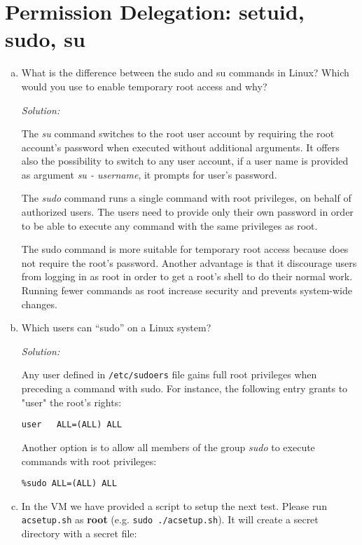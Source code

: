 \documentclass[a4paper,11pt]{article}
\newenvironment{solution}%
{\par{\noindent\small\textit{Solution:}}\vspace{-12pt}\begin{framed}}%
{\end{framed}\par}
\begin{document}
\section{Permission Delegation: setuid, sudo, su}
\begin{enumerate}[(a)]
\item What is the difference between the sudo and su commands in Linux? Which would
you use to enable temporary root access and why?
\ifsolution\begin{solution}
The \emph{su} command switches to the root user account by requiring the root account's password when executed without additional arguments. It offers also the possibility to switch to any user account, if a user name is provided as argument \emph{su - username}, it prompts for user's password.   

The \emph{sudo} command runs a single command with root privileges, on behalf of authorized users. The users need to provide only their own password in order to be able to execute any command with the same privileges as root.  

The sudo command is more suitable for temporary root access because does not require the root's password. Another advantage is that it discourage users from logging in as root in order to get a root's shell to do their normal work. Running fewer commands as root increase security and prevents system-wide changes.

\end{solution}\fi

\item Which users can ``sudo'' on a Linux system? 
\ifsolution
\begin{solution}

Any user defined in \verb|/etc/sudoers| file gains full root privileges when preceding a command with sudo. For instance, the following entry grants to "user" the root's rights: 
\begin{lstlisting}
user   ALL=(ALL) ALL
\end{lstlisting}

Another option is to allow all members of the group \emph{sudo} to execute commands with root privileges: 
\begin{lstlisting}
%sudo ALL=(ALL) ALL
\end{lstlisting}

\end{solution}\fi

\item In the VM we have provided a script to setup the next test. Please run
\texttt{acsetup.sh} as \textbf{root} (e.g. \verb|sudo ./acsetup.sh|). It will
create a secret directory with a secret file:


\end{enumerate}
\end{document}

